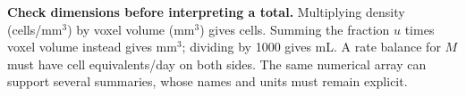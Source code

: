 \textbf{Check dimensions before interpreting a total.} Multiplying density (cells/mm$^3$) by voxel volume (mm$^3$) gives cells. Summing the fraction $u$ times voxel volume instead gives mm$^3$; dividing by 1000 gives mL. A rate balance for $M$ must have cell equivalents/day on both sides. The same numerical array can support several summaries, whose names and units must remain explicit.
\endgroup
